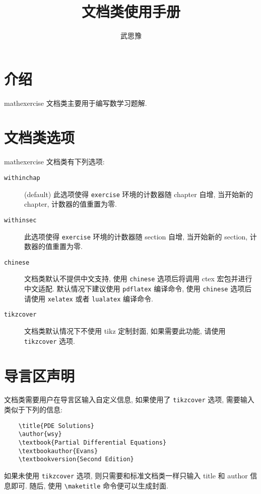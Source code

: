 \documentclass{article}
\title{\bfseries\cls{mathexercise} 文档类使用手册}
\author{武思豫}
\newcommand{\cls}[1]{\textsf{#1}}
\newcommand{\option}[1]{\texttt{#1}}
\newcommand{\env}[1]{\texttt{#1}}
\newcommand{\pkg}[1]{\textsf{#1}}
\begin{document}
  
\maketitle

\section{介绍}

\cls{mathexercise} 文档类主要用于编写数学习题解.


\section{文档类选项}

\cls{mathexercise} 文档类有下列选项:
\begin{description}
  \item [\option{withinchap}] (default) 此选项使得 \env{exercise} 环境的计数器随 chapter 自增,
    当开始新的 chapter, 计数器的值重置为零.
  \item [\option{withinsec}] 此选项使得 \env{exercise} 环境的计数器随 section 自增,
    当开始新的 section, 计数器的值重置为零.
  \item [\option{chinese}] 文档类默认不提供中文支持, 使用 \option{chinese} 选项后将调用 \pkg{ctex}
    宏包并进行中文适配. 默认情况下建议使用 \texttt{pdflatex} 编译命令, 使用 \option{chinese}
    选项后请使用 \texttt{xelatex} 或者 \texttt{lualatex} 编译命令.
  \item [\option{tikzcover}] 文档类默认情况下不使用 tikz 定制封面, 
    如果需要此功能, 请使用 \option{tikzcover} 选项.
\end{description}


\section{导言区声明}

文档类需要用户在导言区输入自定义信息, 如果使用了 \option{tikzcover} 选项,
需要输入类似于下列的信息:
\begin{verbatim}
    \title{PDE Solutions}
    \author{wsy}
    \textbook{Partial Differential Equations}
    \textbookauthor{Evans}
    \textbookversion{Second Edition}
\end{verbatim}
如果未使用 \option{tikzcover} 选项, 则只需要和标准文档类一样只输入
title 和 author 信息即可.
随后, 使用 \verb|\maketitle| 命令便可以生成封面.
\end{document}
